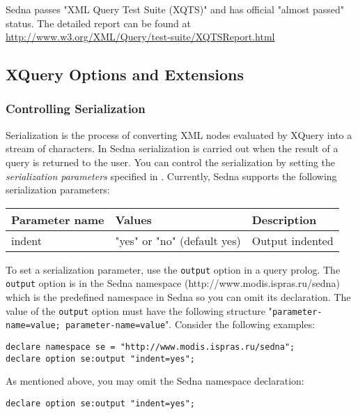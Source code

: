 \documentclass[a4paper,12pt]{article}
\begin{document}
Sedna passes "XML Query Test Suite (XQTS)" and has official "almost passed"
status. The detailed report can be found at
\url{http://www.w3.org/XML/Query/test-suite/XQTSReport.html}


\subsection{XQuery Options and Extensions}
\label{sec:xquery-extensions}

\subsubsection{Controlling Serialization}
\label{indents}
Serialization is the process of converting XML nodes evaluated by XQuery into a
stream of characters. In Sedna serialization is carried out when the result of a
query is returned to the user. You can control the serialization by setting the
\emph{serialization parameters} specified in \cite{paper:query-serialization}.
Currently, Sedna supports the following serialization parameters:

\medskip

\begin{tabular}{|l|l|l|}
\hline
Parameter name & Values & Description \\
\hline
\hline
indent & "yes" or "no" (default yes) & Output indented \\
\hline
\end{tabular}

\medskip

To set a serialization parameter, use the \verb!output! option in a query
prolog. The \verb!output! option is in the Sedna namespace
(http://www.modis.ispras.ru/sedna) which is the predefined namespace in Sedna so
you can omit its declaration. The value of the \verb!output! option must have
the following structure "\verb!parameter-name=value; parameter-name=value!".
Consider the following examples:

\begin{verbatim}
declare namespace se = "http://www.modis.ispras.ru/sedna";
declare option se:output "indent=yes";
\end{verbatim}

As mentioned above, you may omit the Sedna namespace declaration:
\begin{verbatim}
declare option se:output "indent=yes";
\end{verbatim}
\end{document}
